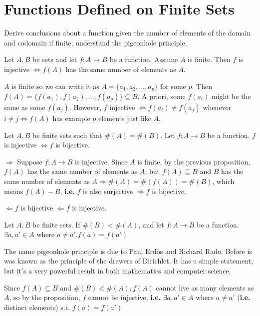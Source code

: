 \documentclass[10pt]{article}
\begin{document}
	\section{Functions Defined on Finite Sets}
	\begin{description}
		\item[Task:] Derive conclusions about a function given the number of elements of the domain and codomain if finite; understand the pigeonhole principle.
		\item[Proposition:] Let $A, B$ be sets and let $f:A \rightarrow B$ be a function. Assume $A$ is finite. Then $f$ is injective $\Leftrightarrow f(A)$ has the same number of elements as $A$.
		\item[Proof:]
		\item $A$ is finite so we can write it as $A = \{a_1, a_2, ..., a_p\}$ for some $p$. Then $f(A) = \{f(a_1), f(a_2), ..., f(a_p)\} \subseteq B$. A priori, some $f(a_i)$ might be the same as some $f(a_j)$. However, $f$ injective $\Leftrightarrow f(a_i) \neq f(a_j)$ whenever $i \neq j \Leftrightarrow f(A)$ has example $p$ elements just like $A$.
		\item[qed]
		\item[Corollary 1] Let $A, B$ be finite sets such that $\#(A) = \#(B)$. Let $f: A \rightarrow B$ be a function. $f$ is injective $\Leftrightarrow f$ is bijective.
		\item[Proof:]
		\item $\Rightarrow$ Suppose $f:A \rightarrow B$ is injective. Since $A$ is finite, by the previous proposition, $f(A)$ has the same number of elements as $A$, but $f(A) \subseteq B$ and $B$ has the same number of elements as $A \Rightarrow \#(A) = \#(f(A)) = \#(B)$, which means $f(A) - B$, \textbf{i.e.} $f$ is also surjective $\Rightarrow f$ is bijective.
		\item $\Leftarrow f$ is bijective $\Leftarrow f$ is injective.
		\item[qed]
		\item[Corollary 2 (The Pigeonhole Principle)] Let $A, B$ be finite sets. If $\#(B) < \#(A)$, and let $f:A \rightarrow B$ be a function. $\exists a, a' \in A$ where $ a \neq a'. f(a) = f(a')$
		\item[Remark:] The name pigeonhole principle is due to Paul Erd\"{o}s and Richard Rado. Before is was known as the principle of the drawers of Dirichlet. It has a simple statement, but it's a very powerful result in both mathematics and computer science.
		\item[Proof:] Since $f(A) \subseteq B$ and $\#(B) < \#(A), f(A)$ cannot hve as many elements as $A$, so by the proposition, $f$ cannot be injective, \textbf{i.e.} $\exists a, a' \in A$ where $a \neq a'$ (\textbf{i.e.} distinct elements) s.t. $f(a) = f(a')$

\end{description}
\end{document}
